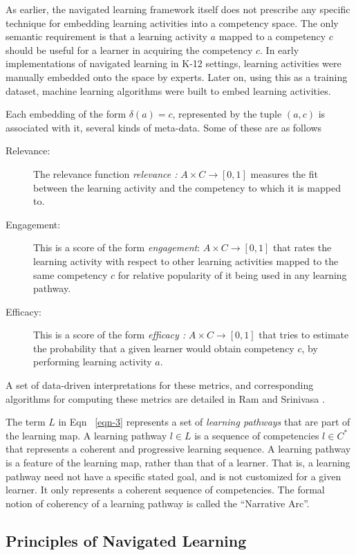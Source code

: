 \begin{multicols}{2}
As earlier, the navigated learning framework itself does not prescribe any specific technique for embedding learning activities into a competency space. The only semantic requirement is that a learning activity $a$ mapped to a competency $c$ should be useful for a learner in acquiring the competency $c$. In early implementations of navigated learning in K-12 settings, learning activities were manually embedded onto the space by experts. Later on, using this as a training dataset, machine learning algorithms were built to embed learning activities.

Each embedding of the form $\delta (a) = c$, represented by the tuple $(a, c)$ is associated with it, several kinds of meta-data. Some of these are as follows
\begin{description}
\item[Relevance:] The relevance function \textit{relevance :} $A \times C \rightarrow [0, 1]$ measures the fit between the learning activity and the competency to which it is mapped to.
\item[Engagement:] This is a score of the form  \textit{engagement}: $A \times C \rightarrow [0, 1]$ that rates the learning activity with respect to other learning activities mapped to the same competency $c$ for relative popularity of it being used in any learning pathway.
\item[Efficacy:] This is a score of the form \textit{efficacy :} $A \times C \rightarrow [0, 1]$ that tries to estimate the probability that a given learner would obtain competency $c$, by performing learning activity $a$.
\end{description}

A set of data-driven interpretations for these metrics, and corresponding algorithms for computing these metrics are detailed in Ram and Srinivasa \cite{art2-key40}.

The term $L$ in Eqn ~\ref{eqn-3} represents a set of \textit{learning pathways} that are part of the learning map. A learning pathway $l \in L$ is a sequence of competencies $l \in C^\ast$ that represents a coherent and progressive learning sequence. A learning pathway is a feature of the learning map, rather than that of a learner. That is, a learning pathway need not have a specific stated goal, and is not customized for a given learner. It only represents a coherent sequence of competencies. The formal notion of coherency of a learning pathway is called the “Narrative Arc”.

\subsection{Principles of Navigated Learning}


\end{multicols}
